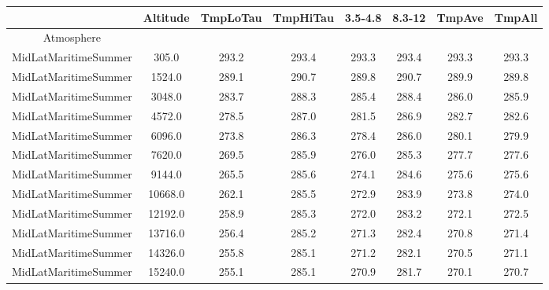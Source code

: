 \documentclass{workpackage}
\begin{document}
\begin{center}

\begin{normalsize}

\begin{tabular}{|c|c|c|c|c|c|c|c|}
\hline
&Altitude&TmpLoTau&TmpHiTau&3.5-4.8&8.3-12&TmpAve&TmpAll\\\hline
Atmosphere&&&&&&&\\\hline
MidLatMaritimeSummer&305.0&293.2&293.4&293.3&293.4&293.3&293.3\\\hline
MidLatMaritimeSummer&1524.0&289.1&290.7&289.8&290.7&289.9&289.8\\\hline
MidLatMaritimeSummer&3048.0&283.7&288.3&285.4&288.4&286.0&285.9\\\hline
MidLatMaritimeSummer&4572.0&278.5&287.0&281.5&286.9&282.7&282.6\\\hline
MidLatMaritimeSummer&6096.0&273.8&286.3&278.4&286.0&280.1&279.9\\\hline
MidLatMaritimeSummer&7620.0&269.5&285.9&276.0&285.3&277.7&277.6\\\hline
MidLatMaritimeSummer&9144.0&265.5&285.6&274.1&284.6&275.6&275.6\\\hline
MidLatMaritimeSummer&10668.0&262.1&285.5&272.9&283.9&273.8&274.0\\\hline
MidLatMaritimeSummer&12192.0&258.9&285.3&272.0&283.2&272.1&272.5\\\hline
MidLatMaritimeSummer&13716.0&256.4&285.2&271.3&282.4&270.8&271.4\\\hline
MidLatMaritimeSummer&14326.0&255.8&285.1&271.2&282.1&270.5&271.1\\\hline
MidLatMaritimeSummer&15240.0&255.1&285.1&270.9&281.7&270.1&270.7\\\hline

\end{tabular}
\end{normalsize}
\end{center}
\end{document}
